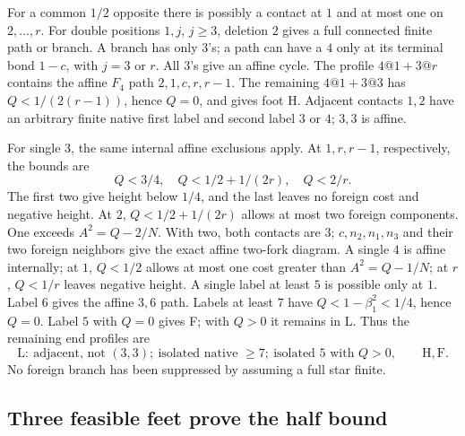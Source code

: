 \documentclass[11pt]{article}
\theoremstyle{definition}
\theoremstyle{remark}
\begin{document}
For a common \(1/2\) opposite there is possibly a contact at \(1\)
and at most one on \(2,\ldots,r\). For double positions \(1,j\),
\(j\ge3\), deletion \(2\) gives a full connected finite path or
branch. A branch has only \(3\)'s; a path can have a \(4\) only
at its terminal bond \(1-c\), with \(j=3\) or \(r\). All \(3\)'s
give an affine cycle. The profile \(4@1+3@r\) contains the affine
\(F_4\) path \(2,1,c,r,r-1\). The remaining \(4@1+3@3\) has
\(Q<1/(2(r-1))\), hence \(Q=0\), and gives foot H.
Adjacent contacts \(1,2\) have an arbitrary finite native first
label and second label \(3\) or \(4\); \(3,3\) is affine.

For single \(3\), the same internal affine exclusions apply.
At \(1,r,r-1\), respectively, the bounds are
\[
 Q<3/4,\quad Q<1/2+1/(2r),\quad Q<2/r.
\]
The first two give height below \(1/4\), and the last leaves no
foreign cost and negative height. At \(2\),
\(Q<1/2+1/(2r)\) allows at most two foreign components.
One exceeds \(A^2=Q-2/N\). With two, both contacts are \(3\);
\(c,n_2,n_1,n_3\) and their two foreign neighbors give the exact
affine two-fork diagram. A single \(4\) is affine internally;
at \(1\), \(Q<1/2\) allows at most one cost greater than
\(A^2=Q-1/N\); at \(r\), \(Q<1/r\) leaves negative height.
A single label at least \(5\) is possible only at \(1\).
Label \(6\) gives the affine \(3,6\) path. Labels at least \(7\)
have \(Q<1-\beta_1^2<1/4\), hence \(Q=0\).
Label \(5\) with \(Q=0\) gives F; with \(Q>0\) it remains in L.
Thus the remaining end profiles are
\[
 \mathrm L:\ \text{adjacent, not }(3,3);
 \ \text{isolated native }\ge7;
 \ \text{isolated }5\text{ with }Q>0,
 \qquad \mathrm H,\mathrm F .
\]
No foreign branch has been suppressed by assuming a full star finite.

\subsection{Three feasible feet prove the half bound}
\end{document}
